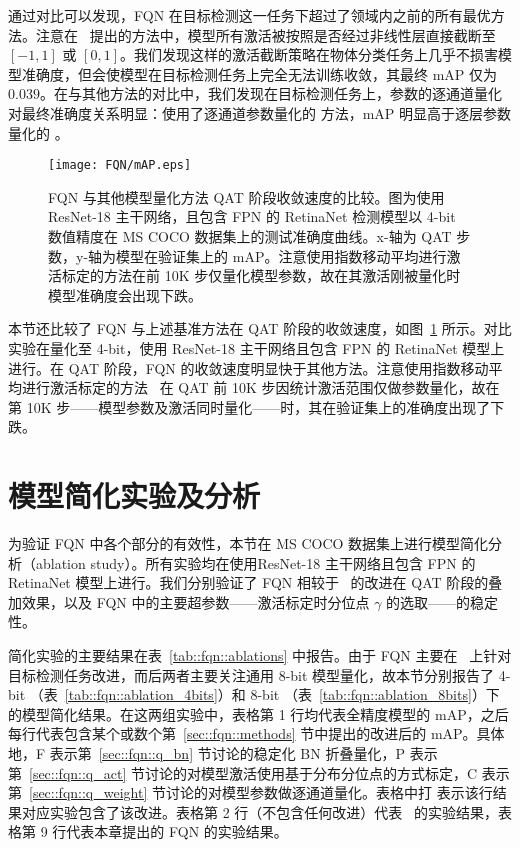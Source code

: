 通过对比可以发现，FQN 在目标检测这一任务下超过了领域内之前的所有最优方法。注意在~\citet{zhou2016dorefanet} 提出的方法中，模型所有激活被按照是否经过非线性层直接截断至 $[-1, 1]$ 或 $[0, 1]$。我们发现这样的激活截断策略在物体分类任务上几乎不损害模型准确度，但会使模型在目标检测任务上完全无法训练收敛，其最终 mAP 仅为 $0.039$。在与其他方法的对比中，我们发现在目标检测任务上，参数的逐通道量化对最终准确度关系明显：使用了逐通道参数量化的 \citet{krishnamoorthi2018quantizing, rastegari2016xnor} 方法，mAP 明显高于逐层参数量化的 \citet{jacob2018quantization}。

\begin{figure}[htb]
  \centering
  \texttt{[image: FQN/mAP.eps]}
  \caption{FQN 与其他模型量化方法 QAT 阶段收敛速度的比较。图为使用 ResNet-18 主干网络，且包含 FPN 的 RetinaNet 检测模型以 4-bit 数值精度在 MS COCO 数据集上的测试准确度曲线。x-轴为 QAT 步数，y-轴为模型在验证集上的 mAP。注意使用指数移动平均进行激活标定的方法在前 10K 步仅量化模型参数，故在其激活刚被量化时模型准确度会出现下跌。}
  \label{fig::fqn::convergence}
\end{figure}

本节还比较了 FQN 与上述基准方法在 QAT 阶段的收敛速度，如图~\ref{fig::fqn::convergence} 所示。对比实验在量化至 4-bit，使用 ResNet-18 主干网络且包含 FPN 的 RetinaNet 模型上进行。在 QAT 阶段，FQN 的收敛速度明显快于其他方法。注意使用指数移动平均进行激活标定的方法~\citep{jacob2018quantization, krishnamoorthi2018quantizing, rastegari2016xnor} 在 QAT 前 10K 步因统计激活范围仅做参数量化，故在第 10K 步——模型参数及激活同时量化——时，其在验证集上的准确度出现了下跌。
\section{模型简化实验及分析} \label{sec::fqn::analysis}
为验证 FQN 中各个部分的有效性，本节在 MS COCO 数据集上进行模型简化分析（ablation study）。所有实验均在使用ResNet-18 主干网络且包含 FPN 的 RetinaNet 模型上进行。我们分别验证了 FQN 相较于~\citet{jacob2018quantization, krishnamoorthi2018quantizing} 的改进在 QAT 阶段的叠加效果，以及 FQN 中的主要超参数——激活标定时分位点 $\gamma$ 的选取——的稳定性。 

简化实验的主要结果在表~\ref{tab::fqn::ablations} 中报告。由于 FQN 主要在~\citet{jacob2018quantization, krishnamoorthi2018quantizing} 上针对目标检测任务改进，而后两者主要关注通用 8-bit 模型量化，故本节分别报告了 4-bit （表~\ref{tab::fqn::ablation_4bits}）和 8-bit （表~\ref{tab::fqn::ablation_8bits}）下的模型简化结果。在这两组实验中，表格第 1 行均代表全精度模型的 mAP，之后每行代表包含某个或数个第~\ref{sec::fqn::methods} 节中提出的改进后的 mAP。具体地，F 表示第~\ref{sec::fqn::q_bn} 节讨论的稳定化 BN 折叠量化，P 表示第~\ref{sec::fqn::q_act} 节讨论的对模型激活使用基于分布分位点的方式标定，C 表示第~\ref{sec::fqn::q_weight} 节讨论的对模型参数做逐通道量化。表格中打 \checkmark 表示该行结果对应实验包含了该改进。表格第 2 行（不包含任何改进）代表~\citet{jacob2018quantization} 的实验结果，表格第 9 行代表本章提出的 FQN 的实验结果。

